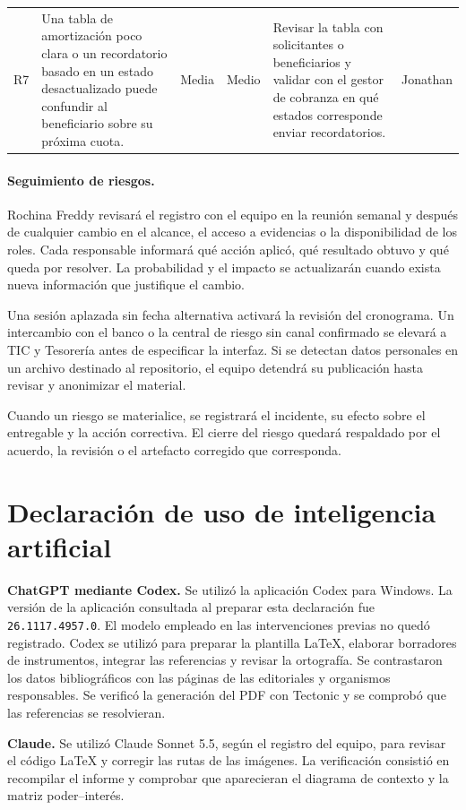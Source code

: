\documentclass[11pt,a4paper]{article}
\begin{document}
\begin{longtable}{@{}L{.045}L{.27}L{.075}L{.08}L{.30}L{.10}@{}}
R7 & Una tabla de amortización poco clara o un recordatorio basado en
un estado desactualizado puede confundir al beneficiario sobre su
próxima cuota.
& Media & Medio
& Revisar la tabla con solicitantes o beneficiarios y validar con el
gestor de cobranza en qué estados corresponde enviar recordatorios.
& Jonathan \\

\end{longtable}
\endgroup
\paragraph{Seguimiento de riesgos.}
Rochina Freddy revisará el registro con el equipo en la reunión semanal y
después de cualquier cambio en el alcance, el acceso a evidencias
o la disponibilidad de los roles. Cada responsable informará
qué acción aplicó, qué resultado obtuvo y qué queda por resolver.
La probabilidad y el impacto se actualizarán cuando exista nueva
información que justifique el cambio.

Una sesión aplazada sin fecha alternativa activará la revisión
del cronograma. Un intercambio con el banco o la central de riesgo
sin canal confirmado se elevará a TIC y Tesorería antes de
especificar la interfaz. Si se detectan datos personales en un
archivo destinado al repositorio, el equipo detendrá su publicación
hasta revisar y anonimizar el material.

Cuando un riesgo se materialice, se registrará el incidente, su
efecto sobre el entregable y la acción correctiva. El cierre del
riesgo quedará respaldado por el acuerdo, la revisión o el
artefacto corregido que corresponda.

\section{Declaración de uso de inteligencia artificial}

\textbf{ChatGPT mediante Codex.}
Se utilizó la aplicación Codex para Windows. La versión de la aplicación
consultada al preparar esta declaración fue \texttt{26.1117.4957.0}.
El modelo empleado en las intervenciones previas no quedó registrado.
Codex se utilizó para preparar la plantilla LaTeX, elaborar borradores
de instrumentos, integrar las referencias y revisar la ortografía.
Se contrastaron los datos bibliográficos con las páginas de las
editoriales y organismos responsables. Se verificó la generación del
PDF con Tectonic y se comprobó que las referencias se resolvieran.

\textbf{Claude.}
Se utilizó Claude Sonnet 5.5, según el registro del equipo, para
revisar el código LaTeX y corregir las rutas de las imágenes. La
verificación consistió en recompilar el informe y comprobar que
aparecieran el diagrama de contexto y la matriz poder--interés.




\clearpage
\appendix

\end{document}

